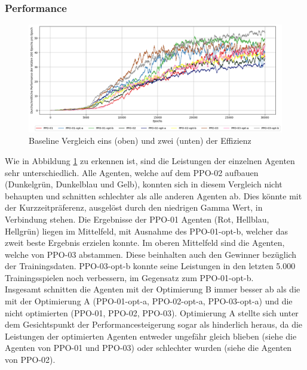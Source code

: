 \subsubsection{Performance} \label{sec:Evaluation_Performance_Optimized}
\begin{figure}[H]
	\centering
	\includegraphics[scale=0.4517]{Abbildungen/Evaluation/optimized-performance.png}
	\caption[Optimized Vergleich Performance]{Baseline Vergleich eins (oben) und zwei (unten) der Effizienz}
	\label{fig:Optimized_Performance}
\end{figure}
Wie in Abbildung \ref{fig:Optimized_Performance} zu erkennen ist, sind die Leistungen der einzelnen Agenten sehr unterschiedlich. Alle Agenten, welche auf dem PPO-02 aufbauen (Dunkelgrün, Dunkelblau und Gelb), konnten sich in diesem Vergleich nicht behaupten und schnitten schlechter als alle anderen Agenten ab. Dies könnte mit der Kurzzeitpräferenz, ausgelöst durch den niedrigen Gamma Wert, in Verbindung stehen. Die Ergebnisse der PPO-01 Agenten (Rot, Hellblau, Hellgrün) liegen im Mittelfeld, mit Ausnahme des PPO-01-opt-b, welcher das zweit beste Ergebnis erzielen konnte. Im oberen Mittelfeld sind die Agenten, welche von PPO-03 abstammen. Diese beinhalten auch den Gewinner bezüglich der Trainingsdaten. PPO-03-opt-b konnte seine Leistungen in den letzten 5.000 Trainingsspielen noch verbessern, im Gegensatz zum PPO-01-opt-b.\\
Insgesamt schnitten die Agenten mit der Optimierung B immer besser ab als die mit der Optimierung A (PPO-01-opt-a, PPO-02-opt-a, PPO-03-opt-a) und die nicht optimierten (PPO-01, PPO-02, PPO-03). Optimierung A stellte sich unter dem Gesichtspunkt der Performancesteigerung sogar als hinderlich heraus, da die Leistungen der optimierten Agenten entweder ungefähr gleich blieben (siehe die Agenten von PPO-01 und PPO-03) oder schlechter wurden (siehe die Agenten von PPO-02).
